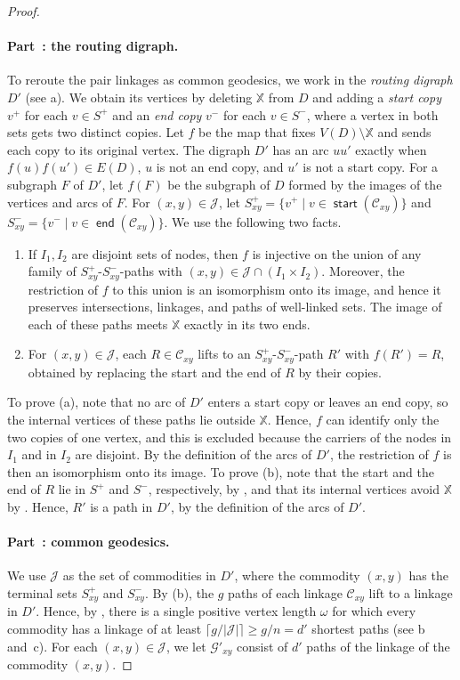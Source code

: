 \documentclass[fontsize=12pt,leading=14pt]{fullpaper}
\DeclareMathOperator{\st}{\mathsf{start}}
\DeclareMathOperator{\en}{\mathsf{end}}
\newcommand{\Ccal}{\mathcal{C}}
\newcommand{\Gcal}{\mathcal{G}}
\newcommand{\Jcal}{\mathcal{J}}
\newcommand{\XX}{\mathbb{X}}
\newcounter{step}
\newcounter{proofstep}[section]
\newcommand{\proofstep}[2]{%
\paragraph*{\refstepcounter{proofstep}\label{#1}Part~\theproofstep: #2}}
\begin{document}
\begin{proof}
  \proofstep{part:core-2}{the routing digraph.}
  To reroute the pair linkages as common geodesics, we work in the \emph{routing digraph} $D'$ (see a).
  We obtain its vertices by deleting $\XX$ from $D$ and adding a \emph{start copy} $v^+$ for each $v\in S^+$ and an \emph{end copy} $v^-$ for each $v\in S^-$, where a vertex in both sets gets two distinct copies.
  Let $f$ be the map that fixes $V(D)\setminus\XX$ and sends each copy to its original vertex.
  The digraph $D'$ has an arc $uu'$ exactly when $f(u)f(u')\in E(D)$, $u$ is not an end copy, and $u'$ is not a start copy.
  For a subgraph $F$ of $D'$, let $f(F)$ be the subgraph of $D$ formed by the images of the vertices and arcs of $F$.
  For $(x,y)\in\Jcal$, let $S^+_{xy}=\{v^+\mid v\in\st(\Ccal_{xy})\}$ and $S^-_{xy}=\{v^-\mid v\in\en(\Ccal_{xy})\}$.
  We use the following two facts.
  \begin{enumerate}[label=\textnormal{(\alph*)}]
    \item If $I_1,I_2$ are disjoint sets of nodes, then $f$ is injective on the union of any family of $S^+_{xy}$-$S^-_{xy}$-paths with $(x,y)\in\Jcal\cap(I_1\times I_2)$.
      Moreover, the restriction of $f$ to this union is an isomorphism onto its image, and hence it preserves intersections, linkages, and paths of well-linked sets.
      The image of each of these paths meets $\XX$ exactly in its two ends.
    \item For $(x,y)\in\Jcal$, each $R\in\Ccal_{xy}$ lifts to an $S^+_{xy}$-$S^-_{xy}$-path $R'$ with $f(R')=R$, obtained by replacing the start and the end of $R$ by their copies.
  \end{enumerate}
  To prove (a), note that no arc of $D'$ enters a start copy or leaves an end copy, so the internal vertices of these paths lie outside $\XX$.
  Hence, $f$ can identify only the two copies of one vertex, and this is excluded because the carriers of the nodes in $I_1$ and in $I_2$ are disjoint.
  By the definition of the arcs of $D'$, the restriction of $f$ is then an isomorphism onto its image.
  To prove (b), note that the start and the end of $R$ lie in $S^+$ and $S^-$, respectively, by , and that its internal vertices avoid $\XX$ by .
  Hence, $R'$ is a path in $D'$, by the definition of the arcs of $D'$.

  \proofstep{part:core-3}{common geodesics.}
  We use $\Jcal$ as the set of commodities in $D'$, where the commodity $(x,y)$ has the terminal sets $S^+_{xy}$ and $S^-_{xy}$.
  By (b), the $g$ paths of each linkage $\Ccal_{xy}$ lift to a linkage in $D'$.
  Hence, by , there is a single positive vertex length $\omega$ for which every commodity has a linkage of at least $\lceil g/|\Jcal|\rceil\ge g/n=d'$ shortest paths (see b and~c).
  For each $(x,y)\in\Jcal$, we let $\Gcal'_{xy}$ consist of $d'$ paths of the linkage of the commodity $(x,y)$.


\end{proof}
\end{document}

